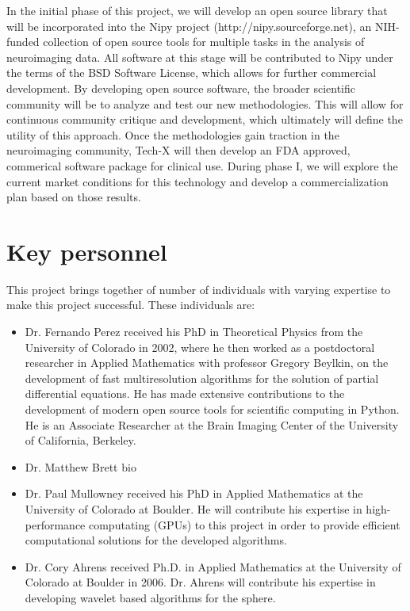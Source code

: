 \documentclass[10pt]{article}
\begin{document}
In the initial phase of this project, we will develop an open source library
that will be incorporated into the Nipy project (http://nipy.sourceforge.net),
an NIH-funded collection of open source tools for multiple tasks in the
analysis of neuroimaging data.  All software at this stage will be contributed
to Nipy under the terms of the BSD Software License, which allows for further
commercial development. By developing open source software, the broader scientific
community will be to analyze and test our new methodologies. This will allow for
continuous community critique and development, which ultimately will define the
utility of this approach. Once the methodologies gain traction in the neuroimaging
community, Tech-X will then develop an FDA approved, commerical software package
for clinical use. During phase I, we will explore the current market conditions
for this technology and develop a commercialization plan based on those results.

\section*{Key personnel}
This project brings together of number of individuals with varying expertise to make this project successful. These individuals are:
\begin{itemize}
  \item{Dr. Fernando Perez received his PhD in Theoretical Physics from the University
of Colorado in 2002, where he then worked as a postdoctoral researcher in
Applied Mathematics with professor Gregory Beylkin, on the development of fast
multiresolution algorithms for the solution of partial differential equations.
He has made extensive contributions to the development of modern open source
tools for scientific computing in Python. He is an Associate Researcher at the
Brain Imaging Center of the University of California, Berkeley.}

  \item{Dr. Matthew Brett bio}
  
  \item{Dr. Paul Mullowney received his PhD in Applied Mathematics at the University of Colorado at Boulder. He will contribute his expertise in high-performance computating (GPUs) to this project in order to provide efficient computational solutions for the developed algorithms.}

  \item{Dr. Cory Ahrens received Ph.D. in Applied Mathematics at the University of Colorado at Boulder in 2006. Dr. Ahrens will contribute his expertise in developing wavelet based algorithms for the sphere.}
  
\end{itemize}




\end{document}

